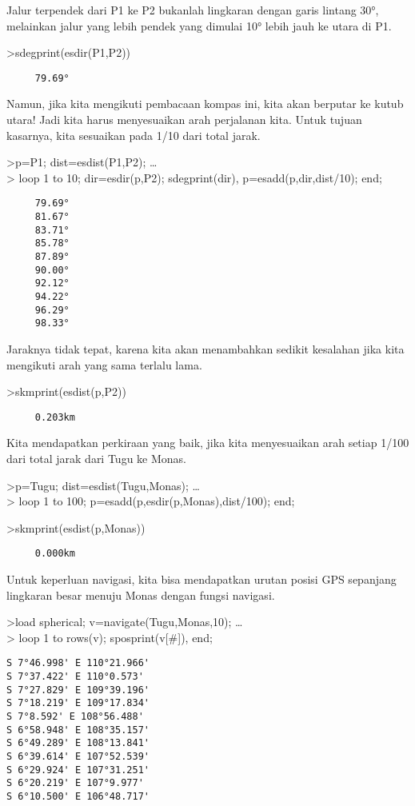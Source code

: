 \documentclass[
]{book}
\begin{document}
Jalur terpendek dari P1 ke P2 bukanlah lingkaran dengan garis lintang 30°, melainkan jalur yang lebih pendek yang dimulai 10° lebih jauh ke utara di P1.

\textgreater sdegprint(esdir(P1,P2))

\begin{verbatim}
     79.69°
\end{verbatim}

Namun, jika kita mengikuti pembacaan kompas ini, kita akan berputar ke kutub utara! Jadi kita harus menyesuaikan arah perjalanan kita. Untuk tujuan kasarnya, kita sesuaikan pada 1/10 dari total jarak.

\textgreater p=P1; dist=esdist(P1,P2); \ldots{}\\
\textgreater{} loop 1 to 10; dir=esdir(p,P2); sdegprint(dir), p=esadd(p,dir,dist/10); end;

\begin{verbatim}
     79.69°
     81.67°
     83.71°
     85.78°
     87.89°
     90.00°
     92.12°
     94.22°
     96.29°
     98.33°
\end{verbatim}

Jaraknya tidak tepat, karena kita akan menambahkan sedikit kesalahan jika kita mengikuti arah yang sama terlalu lama.

\textgreater skmprint(esdist(p,P2))

\begin{verbatim}
     0.203km
\end{verbatim}

Kita mendapatkan perkiraan yang baik, jika kita menyesuaikan arah setiap 1/100 dari total jarak dari Tugu ke Monas.

\textgreater p=Tugu; dist=esdist(Tugu,Monas); \ldots{}\\
\textgreater{} loop 1 to 100; p=esadd(p,esdir(p,Monas),dist/100); end;

\textgreater skmprint(esdist(p,Monas))

\begin{verbatim}
     0.000km
\end{verbatim}

Untuk keperluan navigasi, kita bisa mendapatkan urutan posisi GPS sepanjang lingkaran besar menuju Monas dengan fungsi navigasi.

\textgreater load spherical; v=navigate(Tugu,Monas,10); \ldots{}\\
\textgreater{} loop 1 to rows(v); sposprint(v{[}\#{]}), end;

\begin{verbatim}
S 7°46.998' E 110°21.966'
S 7°37.422' E 110°0.573'
S 7°27.829' E 109°39.196'
S 7°18.219' E 109°17.834'
S 7°8.592' E 108°56.488'
S 6°58.948' E 108°35.157'
S 6°49.289' E 108°13.841'
S 6°39.614' E 107°52.539'
S 6°29.924' E 107°31.251'
S 6°20.219' E 107°9.977'
S 6°10.500' E 106°48.717'
\end{verbatim}
\end{document}
